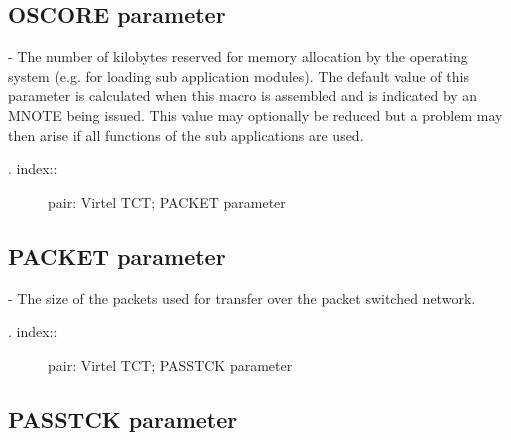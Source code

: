 \documentclass[letterpaper,10pt,english]{sphinxmanual}
\begin{document}
\subsection{OSCORE parameter}
\label{\detokenize{Installation_Guide:oscore-parameter}}
\begin{sphinxVerbatim}[commandchars=\\\{\}]
 
\end{sphinxVerbatim}

 - The number of kilobytes reserved for memory allocation by the operating system (e.g. for loading sub application modules). The default value of this parameter is calculated when this macro is assembled and is indicated by an MNOTE being issued. This value may optionally be reduced but a problem may then arise if all functions of the sub applications are used.
\begin{description}
\item[{. index::}] \leavevmode
pair: Virtel TCT; PACKET parameter

\end{description}


\subsection{PACKET parameter}
\label{\detokenize{Installation_Guide:packet-parameter}}
\begin{sphinxVerbatim}[commandchars=\\\{\}]
 
\end{sphinxVerbatim}

 - The size of the packets used for transfer over the packet switched network.
\label{\detokenize{Installation_Guide:virt457ig-passtck}}\begin{description}
\item[{. index::}] \leavevmode
pair: Virtel TCT; PASSTCK parameter

\end{description}


\subsection{PASSTCK parameter}
\label{\detokenize{Installation_Guide:passtck-parameter}}
\begin{sphinxVerbatim}[commandchars=\\\{\}]
 
\end{sphinxVerbatim}
\end{document}
